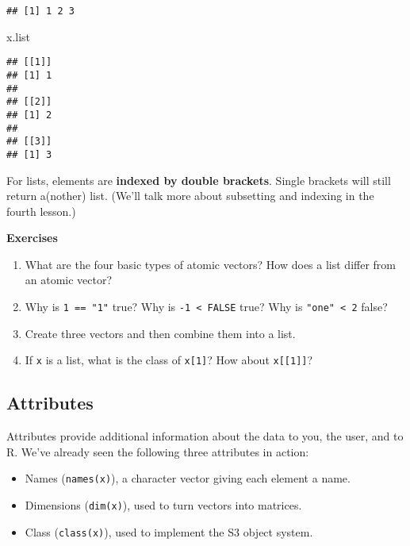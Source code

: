 \documentclass[
]{book}
\newenvironment{Shaded}{\begin{snugshade}}{\end{snugshade}}
\newcommand{\NormalTok}[1]{#1}
\begin{document}
\begin{verbatim}
## [1] 1 2 3
\end{verbatim}

\begin{Shaded}
\begin{Highlighting}[]
\NormalTok{x.list}
\end{Highlighting}
\end{Shaded}

\begin{verbatim}
## [[1]]
## [1] 1
## 
## [[2]]
## [1] 2
## 
## [[3]]
## [1] 3
\end{verbatim}

For lists, elements are \textbf{indexed by double brackets}. Single brackets will still return a(nother) list. (We'll talk more about subsetting and indexing in the fourth lesson.)

\textbf{Exercises}

\begin{enumerate}
\def\labelenumi{\arabic{enumi}.}
\item
  What are the four basic types of atomic vectors? How does a list differ from an atomic vector?
\item
  Why is \texttt{1\ ==\ "1"} true? Why is \texttt{-1\ \textless{}\ FALSE} true? Why is \texttt{"one"\ \textless{}\ 2} false?
\item
  Create three vectors and then combine them into a list.
\item
  If \texttt{x} is a list, what is the class of \texttt{x{[}1{]}}? How about \texttt{x{[}{[}1{]}{]}}?
\end{enumerate}

\hypertarget{attributes}{%
\subsection{Attributes}\label{attributes}}

Attributes provide additional information about the data to you, the user, and to R. We've already seen the following three attributes in action:

\begin{itemize}
\item
  Names (\texttt{names(x)}), a character vector giving each element a name.
\item
  Dimensions (\texttt{dim(x)}), used to turn vectors into matrices.
\item
  Class (\texttt{class(x)}), used to implement the S3 object system.
\end{itemize}
\end{document}
